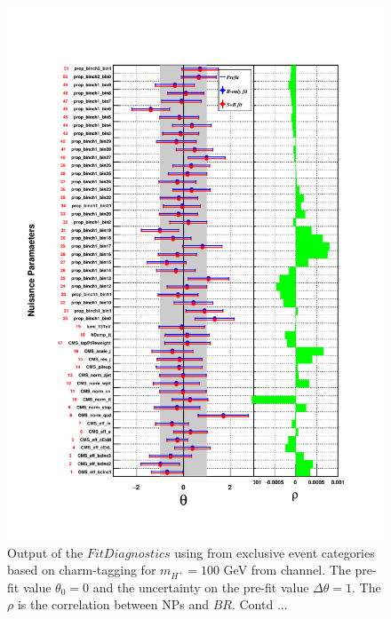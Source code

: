 \begin{figure}
\begin{center}
\includegraphics[width=1.0\textwidth]{Image/MLFit/FitDiag/fitDiag1.pdf}
 \caption{Output of the $FitDiagnostics$ using \mjj from
     exclusive event categories based on charm-tagging for $m_{H^+} = 100$
     GeV from \ljets channel. The pre-fit value $\theta_0 = 0$ and the uncertainty on the
     pre-fit value $\Delta\theta = 1$. The $\rho$ is the correlation between NPs and $BR$. Contd ...}
\label{fig:fitDiag1}
\end{center}
\end{figure}


